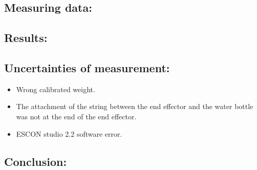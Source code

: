 \subsection*{Measuring data:}




\subsection*{Results:}

\subsection*{Uncertainties of measurement:}
\begin{itemize}
\item Wrong calibrated weight.
\item The attachment of the string between the end effector and the water bottle was not at the end of the end effector.
\item ESCON studio 2.2 software error.
\end{itemize}

\subsection*{Conclusion:}


